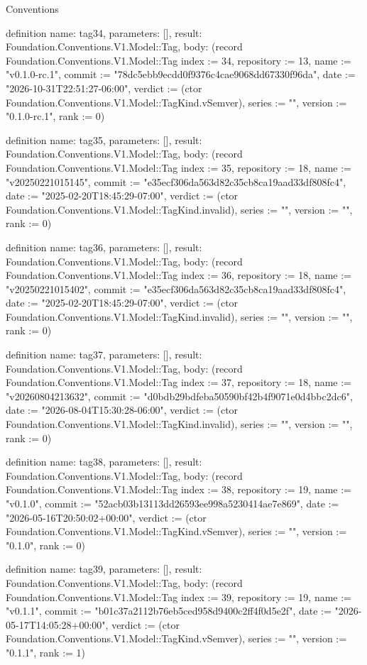 \begin{lexlean}{Conventions}
\begin{semanticmodule}
definition{
  name: tag34,
  parameters: [],
  result: Foundation.Conventions.V1.Model::Tag,
  body: (record Foundation.Conventions.V1.Model::Tag {index := 34, repository := 13, name := "v0.1.0-rc.1", commit := "78dc5ebb9ecdd0f9376c4cae9068dd67330f96da", date := "2026-10-31T22:51:27-06:00", verdict := (ctor Foundation.Conventions.V1.Model::TagKind.vSemver), series := "", version := "0.1.0-rc.1", rank := 0})
}

definition{
  name: tag35,
  parameters: [],
  result: Foundation.Conventions.V1.Model::Tag,
  body: (record Foundation.Conventions.V1.Model::Tag {index := 35, repository := 18, name := "v20250221015145", commit := "e35ecf306da563d82c35cb8ca19aad33df808fc4", date := "2025-02-20T18:45:29-07:00", verdict := (ctor Foundation.Conventions.V1.Model::TagKind.invalid), series := "", version := "", rank := 0})
}

definition{
  name: tag36,
  parameters: [],
  result: Foundation.Conventions.V1.Model::Tag,
  body: (record Foundation.Conventions.V1.Model::Tag {index := 36, repository := 18, name := "v20250221015402", commit := "e35ecf306da563d82c35cb8ca19aad33df808fc4", date := "2025-02-20T18:45:29-07:00", verdict := (ctor Foundation.Conventions.V1.Model::TagKind.invalid), series := "", version := "", rank := 0})
}

definition{
  name: tag37,
  parameters: [],
  result: Foundation.Conventions.V1.Model::Tag,
  body: (record Foundation.Conventions.V1.Model::Tag {index := 37, repository := 18, name := "v20260804213632", commit := "d0bdb29bdfeba50590bf42b4f9071e0d4bbc2dc6", date := "2026-08-04T15:30:28-06:00", verdict := (ctor Foundation.Conventions.V1.Model::TagKind.invalid), series := "", version := "", rank := 0})
}

definition{
  name: tag38,
  parameters: [],
  result: Foundation.Conventions.V1.Model::Tag,
  body: (record Foundation.Conventions.V1.Model::Tag {index := 38, repository := 19, name := "v0.1.0", commit := "52acb03b13113dd26593ee998a5230414ae7e869", date := "2026-05-16T20:50:02+00:00", verdict := (ctor Foundation.Conventions.V1.Model::TagKind.vSemver), series := "", version := "0.1.0", rank := 0})
}

definition{
  name: tag39,
  parameters: [],
  result: Foundation.Conventions.V1.Model::Tag,
  body: (record Foundation.Conventions.V1.Model::Tag {index := 39, repository := 19, name := "v0.1.1", commit := "b01c37a2112b76eb5ced958d9400c2ff4f0d5e2f", date := "2026-05-17T14:05:28+00:00", verdict := (ctor Foundation.Conventions.V1.Model::TagKind.vSemver), series := "", version := "0.1.1", rank := 1})
}


\end{semanticmodule}
\end{lexlean}
